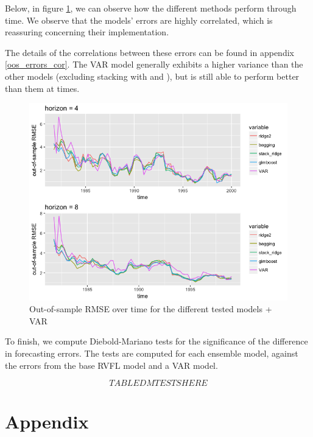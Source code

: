 \begin{verbatim}

\end{verbatim}


Below, in figure \ref{oos_rmse_over_time}, we can observe how the different methods perform through time. We observe that the models' errors are highly correlated, which is reassuring concerning their implementation. 

The details of the correlations between these errors can be found in appendix \ref{oos_errors_cor}. The VAR model generally exhibits a higher variance than the other models (excluding stacking with  and ), but is still able to perform better than them at times.    

\begin{figure}[!htb]
\centering
\includegraphics[width=15cm]{gfx/chapter-rvfl-ensembles/oos_rmse_over_time.png}
\caption{Out-of-sample RMSE over time for the different tested models + VAR}
\label{oos_rmse_over_time}
\end{figure}

\newpage

To finish, we compute Diebold-Mariano tests for the significance of the difference in forecasting errors. The tests are computed for each ensemble model, against the errors from the base RVFL model and a VAR model.  

$$
TABLE DM TESTS HERE
$$


\newpage

\section{Appendix}

